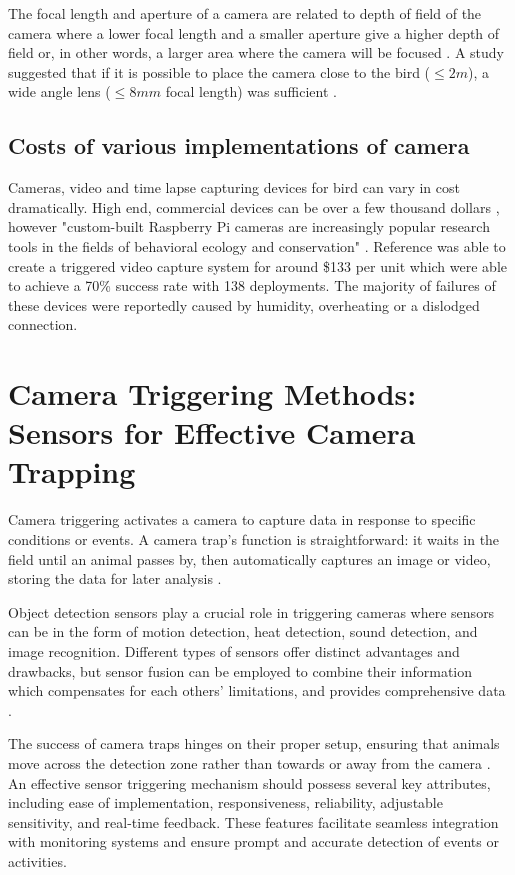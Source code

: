 \documentclass[class=report,11pt,crop=false]{standalone}
\begin{document}
The focal length and aperture of a camera are related to depth of field of the camera where a lower focal length and a smaller aperture give a higher depth of field or, in other words, a larger area where the camera will be focused \cite{CAMFOV1} \cite{CAMFOV2}. A study suggested that if it is possible to place the camera close to the bird ($\leq 2m$), a wide angle lens ($\leq 8 mm$ focal length) was sufficient \cite{CAMDevelopmentOfNestMonitoring}.

\subsection{Costs of various implementations of camera}

Cameras, video and time lapse capturing devices for bird can vary in cost dramatically. High end, commercial devices can be over a few thousand dollars \cite{CAMInexpensiveVideo}, however "custom-built Raspberry Pi cameras are increasingly popular research tools in the fields of behavioral ecology and conservation" \cite[p.~14585]{CAMInexpensiveRPVideo}. Reference \cite{CAMInexpensiveRPVideo} was able to create a triggered video capture system for around \$133 per unit which were able to achieve a 70\% success rate with 138 deployments. The majority of failures of these devices were reportedly caused by humidity, overheating or a dislodged connection. 

\newpage
\section{Camera Triggering Methods: Sensors for Effective Camera Trapping}

Camera triggering activates a camera to capture data in response to specific conditions or events. A camera trap's function is straightforward: it waits in the field until an animal passes by, then automatically captures an image or video, storing the data for later analysis \cite{HowCamersTrapsWork}. 

Object detection sensors play a crucial role in triggering cameras where sensors can be in the form of motion detection, heat detection, sound detection, and image recognition. Different types of sensors offer distinct advantages and drawbacks, but sensor fusion can be employed to combine their information which compensates for each others' limitations, and provides comprehensive data \cite{ImageUltrasonicFusion}.

The success of camera traps hinges on their proper setup, ensuring that animals move across the detection zone rather than towards or away from the camera \cite{HowCamersTrapsWork}. An effective sensor triggering mechanism should possess several key attributes, including ease of implementation, responsiveness, reliability, adjustable sensitivity, and real-time feedback. These features facilitate seamless integration with monitoring systems and ensure prompt and accurate detection of events or activities.
\end{document}
